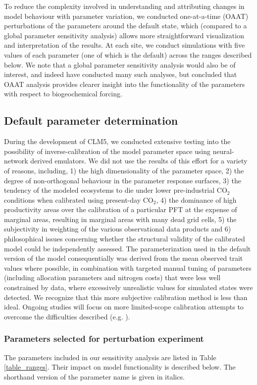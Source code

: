 \documentclass[draft,linenumbers]{agujournal}
\begin{document}
To reduce the complexity involved in understanding and attributing changes in model behaviour with parameter variation, we conducted one-at-a-time (OAAT) perturbations of the parameters around the default state, which (compared to a global parameter sensitivity analysis) allows more straightforward visualization and interpretation of the results.  At each site, we conduct simulations with five values of each parameter (one of which is the default) across the ranges described below. We note that a global parameter sensitivity analysis would also be of interest, and indeed have conducted many such analyses, but concluded that OAAT analysis provides clearer insight into the functionality of the parameters with respect to biogeochemical forcing.

\subsection{Default parameter determination}
During the development of CLM5, we conducted extensive testing into the possibility of inverse-calibration of the model parameter space using neural-network derived emulators. We did not use the results of this effort for a variety of reasons, including,  1) the high dimensionality of the parameter space, 2) the degree of non-orthogonal behaviour in the parameter response surfaces, 3) the tendency of the modeled ecosystems to die under lower pre-industrial CO$_{2}$ conditions when calibrated using present-day CO$_{2}$, 4) the dominance of high productivity areas over the calibration of a particular PFT at the expense of marginal areas, resulting in marginal areas with many dead grid cells, 5) the subjectivity in weighting of the various observational data products and 6) philosophical issues concerning whether the structural validity of the calibrated model could be independently assessed. The parameterization used in the default version of the model consequentially was derived from the mean observed trait values where possible, in combination with targeted manual tuning of parameters (including allocation parameters and nitrogen costs) that were less well constrained by data, where excessively unrealistic values for simulated states were detected. We recognize that this more subjective calibration method is less than ideal. Ongoing studies will focus on more limited-scope calibration attempts to overcome the difficulties described (e.g. \cite{fer2018}). 

\subsubsection{Parameters selected for perturbation experiment}
The parameters included in our sensitivity analysis are listed in Table \ref{table_ranges}. Their impact on model functionality is described below.  The shorthand version of the parameter name is given in italics.  
\end{document}
